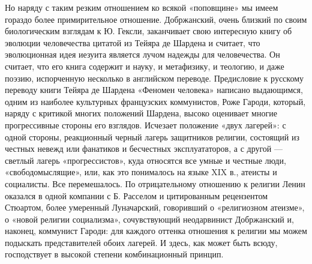 Но наряду  с таким  резким отношением ко  всякой «поповщине»  мы имеем
гораздо более примирительное отношение.  Добржанский, очень близкий по
своим биологическим взглядам к  Ю. Гексли, заканчивает свою интересную
книгу об эволюции человечества цитатой из Тейяра де Шардена и считает,
что эволюционная идея иезуита является лучом надежды для человечества.
Он  считает,  что  его  книга   содержит  и  науку,  и  метафизику,  и
теологию,   и  даже   поэзию,  испорченную   несколько  в   английском
переводе.  Предисловие к  русскому  переводу книги  Тейяра де  Шардена
«Феномен человека»  написано выдающимся, одним из  наиболее культурных
французских  коммунистов,  Роже  Гароди, который,  наряду  с  критикой
многих  положений  Шардена,   высоко  оценивает  многие  прогрессивные
стороны  его  взглядов. Исчезает  положение  «двух  лагерей»: с  одной
стороны, реакционный  черный лагерь  защитников религии,  состоящий из
честных невежд или  фанатиков и бесчестных эксплуататоров,  а с другой
--- светлый лагерь «прогрессистов», куда относятся все умные и честные
люди,  «свободомыслящие», или,  как это  понималось на  языке XIX  в.,
атеисты и социалисты. Все  перемешалось. По отрицательному отношению к
религии Ленин оказался  в одной компании с Б.  Расселом и цитированным
рецензентом  Стюартом,  более   умеренный  Луначарский,  говоривший  о
«религиозном  атеизме», о  «новой  религии социализма»,  сочувствующий
неодарвинист  Добржанский и,  наконец, коммунист  Гароди: для  каждого
оттенка отношения  к религии  мы можем подыскать  представителей обоих
лагерей. И здесь, как может быть всюду, господствует в высокой степени
комбинационный принцип.

